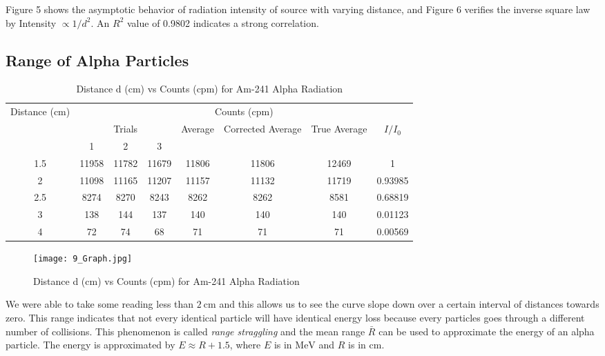 \documentclass[11pt]{article}
\begin{document}
	Figure 5 shows the asymptotic behavior of radiation intensity of source with varying distance, and Figure 6 verifies the inverse square law by Intensity $\propto 1/d^2$. An $R^2$ value of 0.9802 indicates a strong correlation.

\clearpage

	\subsection{Range of Alpha Particles}
	
	\begin{table}[htbp]
		\centering
		\caption{Distance d ($\unit{\centi\meter}$) vs Counts (cpm) for Am-241 Alpha Radiation}
		\begin{tabular}{cccccccc}
			\toprule
			\multirow{3}[6]{*}{Distance ($\unit{\centi\meter}$)} & \multicolumn{7}{c}{Counts (cpm)} \\
			\cmidrule{2-8}      & \multicolumn{3}{c}{Trials} & \multirow{2}[4]{*}{Average} & \multirow{2}[4]{*}{Corrected Average} & \multirow{2}[4]{*}{True Average} & \multirow{2}[4]{*}{$I/I_0$} \\
			\cmidrule{2-4}      & 1 & 2 & 3 &   &   &   &  \\
			\midrule
			1.5 & 11958 & 11782 & 11679 & 11806 & 11806 & 12469 & 1 \\
			2 & 11098 & 11165 & 11207 & 11157 & 11132 & 11719 & 0.93985 \\
			2.5 & 8274 & 8270 & 8243 & 8262 & 8262 & 8581 & 0.68819 \\
			3 & 138 & 144 & 137 & 140 & 140 & 140 & 0.01123 \\
			4 & 72 & 74 & 68 & 71 & 71 & 71 & 0.00569 \\
			\bottomrule
		\end{tabular}%
		\label{tab:9_Table_1}%
	\end{table}%
	
	\begin{figure}[htbp]
		\centering
		\texttt{[image: 9\_Graph.jpg]}
		\caption{Distance d ($\unit{\centi\meter}$) vs Counts (cpm) for Am-241 Alpha Radiation}
		\label{fig:9_Graph}
	\end{figure}
	
	We were able to take some reading less than $\qty{2}{\centi\meter}$ and this allows us to see the curve slope down over a certain interval of distances towards zero. This range indicates that not every identical particle will have identical energy loss because every particles goes through a different number of collisions. This phenomenon is called \textit{range straggling} and the mean range $\bar{R}$ can be used to approximate the energy of an alpha particle. The energy is approximated by $E \approx R + 1.5$, where $E$ is in $\unit{\mega\electronvolt}$ and $R$ is in $\unit{\centi\meter}$.
	
\end{document}

